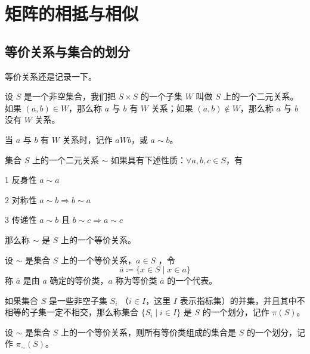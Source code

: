 
\chapter{矩阵的相抵与相似}

\section{等价关系与集合的划分}

等价关系还是记录一下。

\begin{definition}
    设 $S$ 是一个非空集合，我们把 $S\times S$ 的一个子集 $W$ 叫做 $S$ 上的一个二元关系。如果 $(a,b)\in W$，那么称 $a$ 与 $b$ 有 $W$ 关系；如果 $(a,b)\notin W$，那么称 $a$ 与 $b$ 没有 $W$ 关系。
\end{definition}

当 $a$ 与 $b$ 有 $W$ 关系时，记作 $aWb$，或 $a\sim b$。

\begin{definition}
    集合 $S$ 上的一个二元关系 $\sim$ 如果具有下述性质：$\forall a,b,c\in S$，有

    \num{1} 反身性 $a\sim a$

    \num{2} 对称性 $a\sim b \Rightarrow b\sim a$

    \num{3} 传递性 $a\sim b$ 且 $b\sim c \Rightarrow a\sim c$ 

    那么称 $\sim$ 是 $S$ 上的一个等价关系。
\end{definition}

\begin{definition}
    设 $\sim$ 是集合 $S$ 上的一个等价关系，$a\in S$ ，令
    \[\overline{a} \coloneqq  \{x\in S \mid x\in a\}\]
    称 $\overline{a}$ 是由 $a$ 确定的等价类，$a$ 称为等价类 $\overline{a}$ 的一个代表。
\end{definition}

\begin{definition}
    如果集合 $S$ 是一些非空子集 $S_i$ （$i\in I$，这里 $I$ 表示指标集）的并集，并且其中不相等的子集一定不相交，那么称集合 $\{S
    _i \mid i\in I\}$ 是 $S$ 的一个划分，记作 $\pi(S)$。
\end{definition}

\begin{theorem}
    设 $\sim$ 是集合 $S$ 上的一个等价关系，则所有等价类组成的集合是 $S$ 的一个划分，记作 $\pi_\sim(S)$。
\end{theorem}

